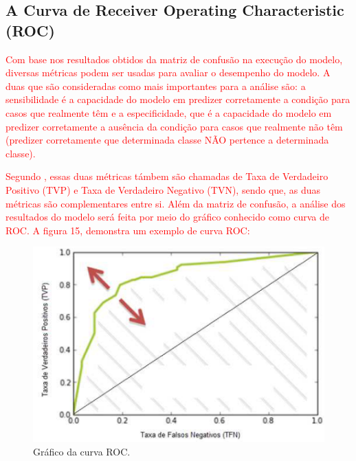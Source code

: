 \subsection{A Curva de Receiver Operating Characteristic (ROC)}

\par
\textcolor{red}{Com base nos resultados obtidos da matriz de confusão na execução do modelo, diversas métricas podem ser usadas para avaliar o desempenho do modelo. A duas que são consideradas como mais importantes para a análise são: a sensibilidade é a capacidade do modelo em predizer corretamente a condição para casos que realmente têm e a especificidade, que é a capacidade do modelo em predizer corretamente a ausência da condição para casos que realmente não têm (predizer corretamente que determinada classe NÃO pertence a determinada classe)\cite{Cesar, Carvalho2014}.}

\par
\textcolor{red}{Segundo , essas duas métricas támbem são chamadas de Taxa de Verdadeiro Positivo (TVP) e Taxa de Verdadeiro Negativo (TVN), sendo que, as duas métricas são complementares entre si. Além da matriz de confusão, a análise dos resultados do modelo será feita por meio do gráfico conhecido como curva de ROC. A figura 15, demonstra um exemplo de curva ROC:}

\par
\begin{figure}[!htp]
	\begin{center}
    \caption{\label{fig:waveform_fig} Gráfico da curva ROC.}
	\includegraphics[scale=0.80]{Figuras/Curva_roc.png}
	\end{center}
\end{figure}

